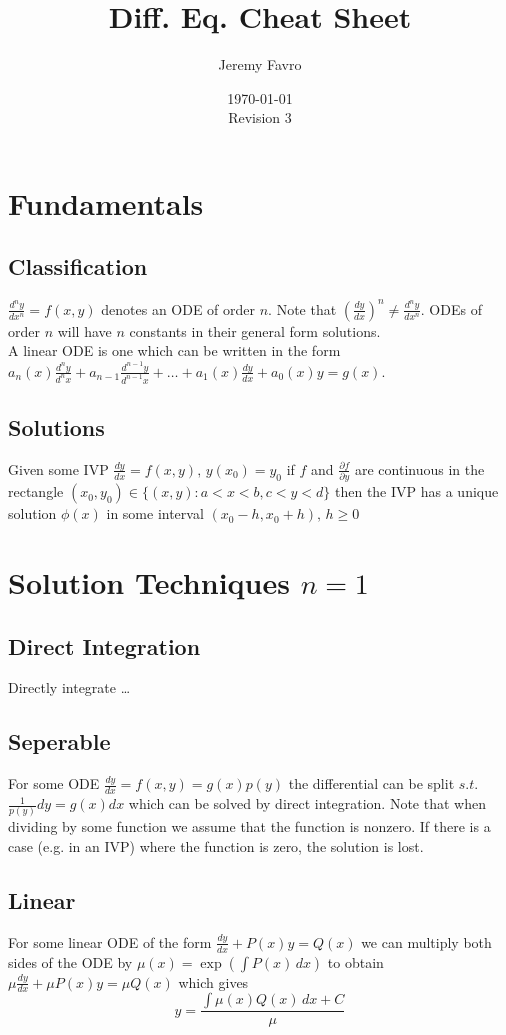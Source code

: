\documentclass[10pt,landscape,letterpaper]{cheatsheet}
\title{Diff. Eq. Cheat Sheet}
\author{Jeremy Favro}
\date{\today\\Revision 3}
\begin{document}
\maketitle

\section*{Fundamentals}
\subsection*{Classification}
$\frac{d^ny}{dx^n}=f(x,y)$ denotes an ODE of order $n$. Note that $(\frac{dy}{dx})^n\neq\frac{d^ny}{dx^n}$. ODEs of order $n$ will have $n$ constants in their general form solutions.\\
A linear ODE is one which can be written in the form $a_n(x)\frac{d^ny}{d^nx}+a_{n-1}\frac{d^{n-1}y}{d^{n-1}x}+\dots+a_1(x)\frac{dy}{dx}+a_0(x)y=g(x)$.\\
\subsection*{Solutions}
Given some IVP $\frac{dy}{dx}=f(x,y), \, y(x_0)=y_0$ if $f$ and $\frac{\partial f}{\partial y}$ are continuous in the rectangle $(x_0,y_0)\in \{(x,y):a<x<b,c<y<d\}$ then the
IVP has a unique solution $\phi(x)$ in some interval $(x_0-h,x_0+h), \, h\geq 0$


\section*{Solution Techniques $n=1$}
\subsection*{Direct Integration}
Directly integrate \dots
\subsection*{Seperable}
For some ODE $\frac{dy}{dx}=f(x,y)=g(x)p(y)$ the differential can be split $s.t.$ $\frac{1}{p(y)}dy=g(x)dx$ which can be solved by direct integration.
Note that when dividing by some function we assume that the function is nonzero. If there is a case (e.g. in an IVP) where the function is zero, the solution
is lost.
\subsection*{Linear}
For some linear ODE of the form $\frac{dy}{dx}+P(x)y=Q(x)$ we can multiply both sides of the ODE by $\mu(x)=\exp\left(\int P(x)\, dx\right)$
to obtain $\mu\frac{dy}{dx}+\mu P(x)y= \mu Q(x)$ which gives
$$y=\frac{\int\mu(x) Q(x)\,dx+C}{\mu}$$
\end{document}
